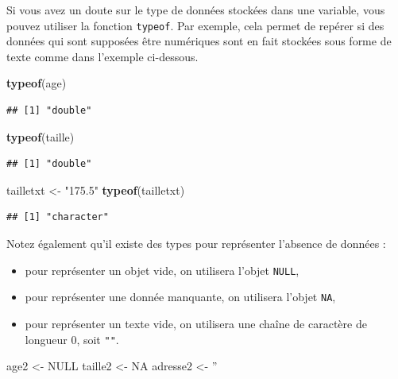 \documentclass[
  11pt,
  french,
]{book}
\makeatletter
\newenvironment{Shaded}{\begin{snugshade}}{\end{snugshade}}
\newcommand{\KeywordTok}[1]{\textcolor[rgb]{0.13,0.29,0.53}{\textbf{#1}}}
\newcommand{\NormalTok}[1]{#1}
\newcommand{\OtherTok}[1]{\textcolor[rgb]{0.56,0.35,0.01}{#1}}
\newcommand{\StringTok}[1]{\textcolor[rgb]{0.31,0.60,0.02}{#1}}
\providecommand{\tightlist}{%
  \setlength{\itemsep}{0pt}\setlength{\parskip}{0pt}}
\newenvironment{kframe}{%
\medskip{}
\setlength{\fboxsep}{.8em}
 \def\at@end@of@kframe{}%
 \ifinner\ifhmode%
  \def\at@end@of@kframe{\end{minipage}}%
  \begin{minipage}{\columnwidth}%
 \fi\fi%
 \def\FrameCommand##1{\hskip\@totalleftmargin \hskip-\fboxsep
 \colorbox{shadecolor}{##1}\hskip-\fboxsep
     \hskip-\linewidth \hskip-\@totalleftmargin \hskip\columnwidth}%
 \MakeFramed {\advance\hsize-\width
   \@totalleftmargin\z@ \linewidth\hsize
   \@setminipage}}%
 {\par\unskip\endMakeFramed%
 \at@end@of@kframe}
\renewenvironment{Shaded}{\begin{kframe}}{\end{kframe}}
\makeatother
\begin{document}
Si vous avez un doute sur le type de données stockées dans une variable, vous pouvez utiliser la fonction \texttt{typeof}. Par exemple, cela permet de repérer si des données qui sont supposées être numériques sont en fait stockées sous forme de texte comme dans l'exemple ci-dessous.

\begin{Shaded}
\begin{Highlighting}[]
\KeywordTok{typeof}\NormalTok{(age)}
\end{Highlighting}
\end{Shaded}

\begin{verbatim}
## [1] "double"
\end{verbatim}

\begin{Shaded}
\begin{Highlighting}[]
\KeywordTok{typeof}\NormalTok{(taille)}
\end{Highlighting}
\end{Shaded}

\begin{verbatim}
## [1] "double"
\end{verbatim}

\begin{Shaded}
\begin{Highlighting}[]
\NormalTok{tailletxt <-}\StringTok{ "175.5"}
\KeywordTok{typeof}\NormalTok{(tailletxt)}
\end{Highlighting}
\end{Shaded}

\begin{verbatim}
## [1] "character"
\end{verbatim}

Notez également qu'il existe des types pour représenter l'absence de données :

\begin{itemize}
\tightlist
\item
  pour représenter un objet vide, on utilisera l'objet \texttt{NULL},
\item
  pour représenter une donnée manquante, on utilisera l'objet \texttt{NA},
\item
  pour représenter un texte vide, on utilisera une chaîne de caractère de longueur 0, soit \texttt{""}.
\end{itemize}

\begin{Shaded}
\begin{Highlighting}[]
\NormalTok{age2 <-}\StringTok{ }\OtherTok{NULL}
\NormalTok{taille2 <-}\StringTok{ }\OtherTok{NA}
\NormalTok{adresse2 <-}\StringTok{ ''}
\end{Highlighting}
\end{Shaded}
\end{document}
